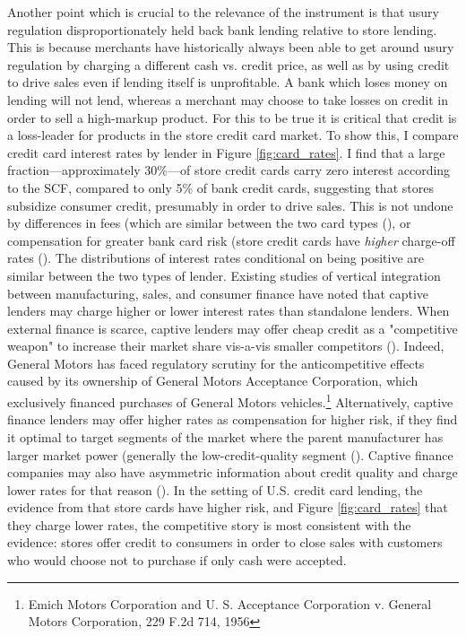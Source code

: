 \documentclass[12pt,english]{article}
\begin{document}
Another point which is crucial to the relevance of the instrument is that usury regulation disproportionately held back bank lending relative to store lending. This is because merchants have historically always been able to get around usury regulation by charging a different cash vs. credit price, as well as by using credit to drive sales even if lending itself is unprofitable. A bank which loses money on lending will not lend, whereas a merchant may choose to take losses on credit in order to sell a high-markup product. For this to be true it is critical that credit is a loss-leader for products in the store credit card market. To show this, I compare credit card interest rates by lender in Figure \ref{fig:card_rates}. I find that a large fraction---approximately 30\%---of store credit cards carry zero interest according to the SCF, compared to only 5\% of bank credit cards, suggesting that stores subsidize consumer credit, presumably in order to drive sales. This is not undone by differences in fees (which are similar between the two card types (\cite{consumer_financial_protection_bureau_credit_2022}), or compensation for greater bank card risk (store credit cards have \emph{higher} charge-off rates (\cite{consumer_financial_protection_bureau_consumer_2019}). The distributions of interest rates conditional on being positive are similar between the two types of lender. Existing studies of vertical integration between manufacturing, sales, and consumer finance have noted that captive lenders may charge higher or lower interest rates than standalone lenders. When external finance is scarce, captive lenders may offer cheap credit as a "competitive weapon" to increase their market share vis-a-vis smaller competitors (\cite{banner_competition_1958}). Indeed, General Motors has faced regulatory scrutiny for the anticompetitive effects caused by its ownership of General Motors Acceptance Corporation, which exclusively financed purchases of General Motors vehicles.\footnote{Emich Motors Corporation and U. S. Acceptance Corporation v. General Motors Corporation, 229 F.2d 714, 1956} Alternatively, captive finance lenders may offer higher rates as compensation for higher risk, if they find it optimal to target segments of the market where the parent manufacturer has larger market power (generally the low-credit-quality segment (\cite{benetton_credit_2022}). Captive finance companies may also have asymmetric information about credit quality and charge lower rates for that reason (\cite{stroebel_asymmetric_2016}). In the setting of U.S. credit card lending, the evidence from \cite{consumer_financial_protection_bureau_consumer_2019} that store cards have higher risk, and Figure \ref{fig:card_rates} that they charge lower rates, the competitive story is most consistent with the evidence: stores offer credit to consumers in order to close sales with customers who would choose not to purchase if only cash were accepted.
\end{document}
